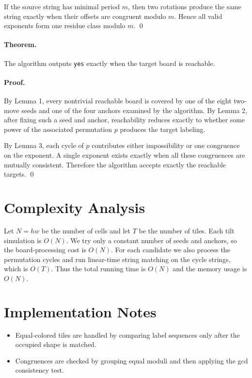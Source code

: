 \documentclass[11pt]{article}
\begin{document}
If the source string has minimal period $m$, then two rotations produce the same string exactly when
their offsets are congruent modulo $m$. Hence all valid exponents form one residue class modulo $m$.
\qed

\paragraph{Theorem.}
The algorithm outputs \texttt{yes} exactly when the target board is reachable.

\paragraph{Proof.}
By Lemma 1, every nontrivial reachable board is covered by one of the eight two-move seeds and one of
the four anchors examined by the algorithm. By Lemma 2, after fixing such a seed and anchor, reachability
reduces exactly to whether some power of the associated permutation $p$ produces the target labeling.

By Lemma 3, each cycle of $p$ contributes either impossibility or one congruence on the exponent. A
single exponent exists exactly when all these congruences are mutually consistent. Therefore the algorithm
accepts exactly the reachable targets. \qed

\section*{Complexity Analysis}

Let $N=hw$ be the number of cells and let $T$ be the number of tiles. Each tilt simulation is $O(N)$. We
try only a constant number of seeds and anchors, so the board-processing cost is $O(N)$. For each
candidate we also process the permutation cycles and run linear-time string matching on the cycle
strings, which is $O(T)$. Thus the total running time is $O(N)$ and the memory usage is $O(N)$.

\section*{Implementation Notes}

\begin{itemize}[leftmargin=*]
    \item Equal-colored tiles are handled by comparing label sequences only after the occupied shape is
    matched.
    \item Congruences are checked by grouping equal moduli and then applying the gcd consistency test.
\end{itemize}
\end{document}
